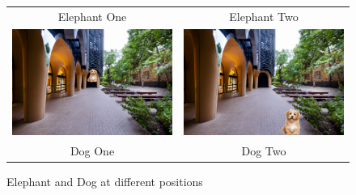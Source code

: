 \documentclass{article}
\begin{document}
\begin{figure}[h!]
\begin{tabular}{cc}
        Elephant One & Elephant Two \\
        \includegraphics[scale=0.08]{images/dog(1500x1000).jpg} & \includegraphics[scale=0.08]{images/dog(2000x2000).jpg} \\
        Dog One & Dog Two \\
    \end{tabular}
    \caption{Elephant and Dog at different positions}
    \label{fig:animal_grid}
\end{figure}

\newpage


\end{document}
